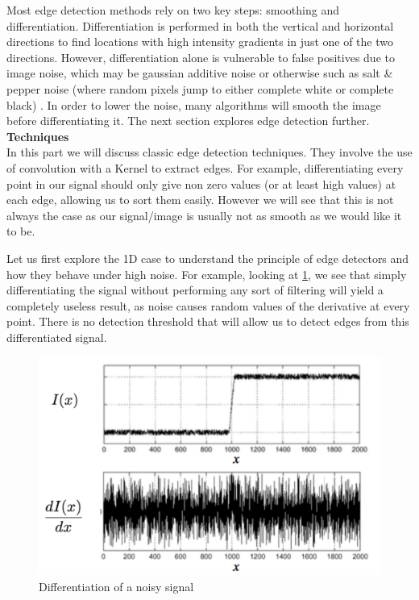 \documentclass[twoside]{article}
\begin{document}
Most edge detection methods rely on two key steps: smoothing and differentiation. Differentiation is performed in both the vertical and horizontal directions to find locations with high intensity gradients in just one of the two directions. However, differentiation alone is vulnerable to false positives due to image noise, which may be gaussian additive noise or otherwise such as salt \& pepper noise (where random pixels jump to either complete white or complete black) \cite{saltnpepper}. In order to lower the noise, many algorithms will smooth the image before differentiating it. The next section explores edge detection further. \\

\textbf{Techniques}\\
In this part we will discuss classic edge detection techniques. They involve the use of convolution with a Kernel to extract edges. For example, differentiating every point in our signal should only give non zero values (or at least high values) at each edge, allowing us to sort them easily. However we will see that this is not always the case as our signal/image is usually not as smooth as we would like it to be.

Let us first explore the 1D case to understand the principle of edge detectors and how they behave under high noise. For example, looking at \ref{noisy}, we see that simply differentiating the signal without performing any sort of filtering will yield a completely useless result, as noise causes random values of the derivative at every point. There is no detection threshold that will allow us to detect edges from this differentiated signal.

\begin{figure}[h]
  \centering
  \includegraphics[scale=.4]{noisy_uncorrected.PNG}
    \caption{Differentiation of a noisy signal}
    \label{noisy}
\end{figure}
\end{document}
